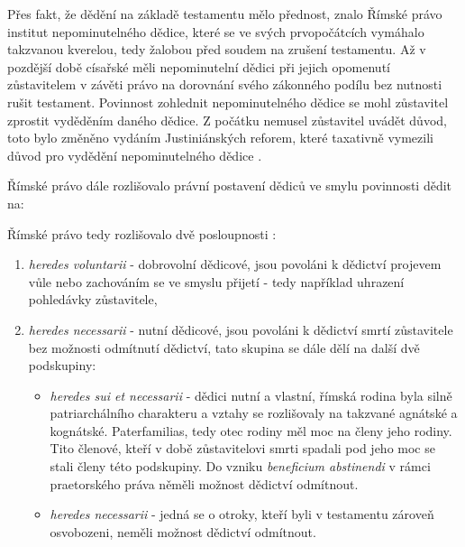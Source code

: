 \documentclass{article}
\begin{document}
Přes fakt, že dědění na základě testamentu mělo přednost, znalo Římské právo institut nepominutelného dědice, které se ve svých prvopočátcích vymáhalo takzvanou kverelou, tedy žalobou před soudem na zrušení testamentu. Až v pozdější době císařské měli nepominutelní dědici při jejich opomenutí zůstavitelem v závěti právo na dorovnání svého zákonného podílu bez nutnosti rušit testament. Povinnost zohlednit nepominutelného dědice se mohl zůstavitel zprostit vyděděním daného dědice. Z počátku nemusel zůstavitel uvádět důvod, toto bylo změněno vydáním Justiniánských reforem, které taxativně vymezili důvod pro vydědění nepominutelného dědice  . \\

\newpage

Římské právo dále rozlišovalo právní postavení dědiců ve smylu povinnosti dědit na:

\vspace{5 mm}

Římské právo tedy rozlišovalo dvě posloupnosti :
\begin{enumerate}
\item \textit{heredes voluntarii} - dobrovolní dědicové, jsou povoláni k dědictví projevem vůle nebo zachováním se ve smyslu přijetí - tedy například uhrazení pohledávky zůstavitele,
\item \textit{heredes necessarii} - nutní dědicové, jsou povoláni k dědictví smrtí zůstavitele bez možnosti odmítnutí dědictví, tato skupina se dále dělí na další dvě podskupiny:
\begin{itemize}
\item \textit{heredes sui et necessarii} - dědici nutní a vlastní, římská rodina byla silně patriarchálního charakteru a vztahy se rozlišovaly na takzvané agnátské a kognátské. Paterfamilias, tedy otec rodiny měl moc na členy jeho rodiny. Tito členové, kteří v době zůstavitelovi smrti spadali pod jeho moc se stali členy této podskupiny. Do vzniku \textit{beneficium abstinendi} v rámci praetorského práva něměli možnost dědictví odmítnout.
\item \textit{heredes necessarii} - jedná se o otroky, kteří byli v testamentu zároveň osvobozeni, neměli možnost dědictví odmítnout.
\end{itemize}
\end{enumerate}
\end{document}
